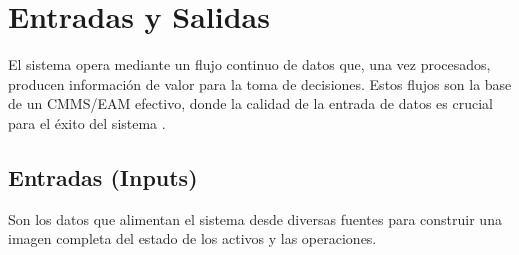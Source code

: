 \section{Entradas y Salidas}

El sistema opera mediante un flujo continuo de datos que, una vez procesados, producen información de valor para la toma de decisiones. Estos flujos son la base de un CMMS/EAM efectivo, donde la calidad de la entrada de datos es crucial para el éxito del sistema \parencite{fiix:2019, fluke:2020, mazenko:2015, obrien:sf}.

\subsection{Entradas (Inputs)}

Son los datos que alimentan el sistema desde diversas fuentes para construir una imagen completa del estado de los activos y las operaciones.

